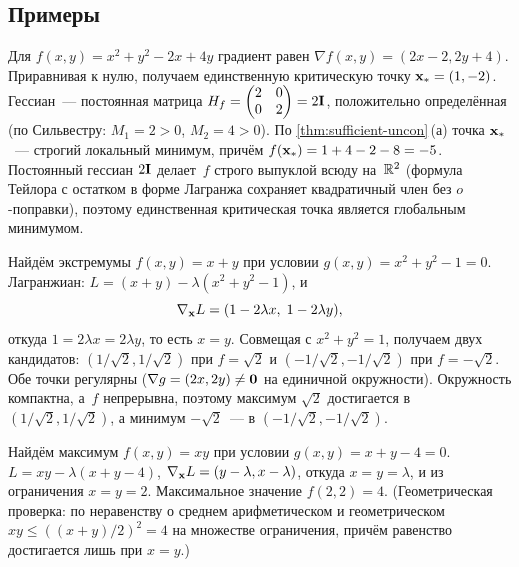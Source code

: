 \subsection*{Примеры}

\begin{example}
\label{ex:uncon-quadratic}
Для $f(x, y) = x^2 + y^2 - 2x + 4y$ градиент равен
$\nabla f(x, y) = (2x - 2, 2y + 4)$. Приравнивая к нулю, получаем
единственную критическую точку $\mathbf{x}_* = (1, -2)$. Гессиан~---
постоянная матрица $H_f = \begin{pmatrix} 2 & 0 \\ 0 & 2 \end{pmatrix} = 2 \mathbf{I}$,
положительно определённая (по Сильвестру: $M_1 = 2 > 0$, $M_2 = 4 > 0$).
По \cref{thm:sufficient-uncon}\,(а) точка $\mathbf{x}_*$~--- строгий
локальный минимум, причём $f(\mathbf{x}_*) = 1 + 4 - 2 - 8 = -5$.
Постоянный гессиан $2\mathbf{I}$ делает~$f$ строго выпуклой всюду
на~$\mathbb{R}^2$ (формула Тейлора с остатком в форме Лагранжа сохраняет
квадратичный член без $o$-поправки), поэтому единственная критическая
точка является глобальным минимумом.
\end{example}

\begin{example}
\label{ex:lagrange-circle}
Найдём экстремумы $f(x, y) = x + y$ при условии
$g(x, y) = x^2 + y^2 - 1 = 0$. Лагранжиан:
$L = (x + y) - \lambda(x^2 + y^2 - 1)$, и
\[
  \nabla_{\mathbf{x}} L = (1 - 2\lambda x,\; 1 - 2\lambda y),
\]
откуда $1 = 2\lambda x = 2 \lambda y$, то есть $x = y$. Совмещая с
$x^2 + y^2 = 1$, получаем двух кандидатов:
$(1/\sqrt{2}, 1/\sqrt{2})$ при $f = \sqrt{2}$ и
$(-1/\sqrt{2}, -1/\sqrt{2})$ при $f = -\sqrt{2}$. Обе точки регулярны
($\nabla g = (2x, 2y) \neq \mathbf{0}$ на единичной окружности).
Окружность компактна, а~$f$ непрерывна, поэтому максимум $\sqrt{2}$
достигается в $(1/\sqrt{2}, 1/\sqrt{2})$, а минимум $-\sqrt{2}$~---
в $(-1/\sqrt{2}, -1/\sqrt{2})$.
\end{example}

\begin{example}
\label{ex:lagrange-linear}
Найдём максимум $f(x, y) = xy$ при условии $g(x, y) = x + y - 4 = 0$.
$L = xy - \lambda(x + y - 4)$,
$\nabla_{\mathbf{x}} L = (y - \lambda, x - \lambda)$, откуда
$x = y = \lambda$, и из ограничения $x = y = 2$. Максимальное
значение $f(2, 2) = 4$. (Геометрическая проверка: по неравенству о
среднем арифметическом и геометрическом
$xy \le ((x + y)/2)^2 = 4$ на множестве ограничения, причём равенство
достигается лишь при $x = y$.)
\end{example}

